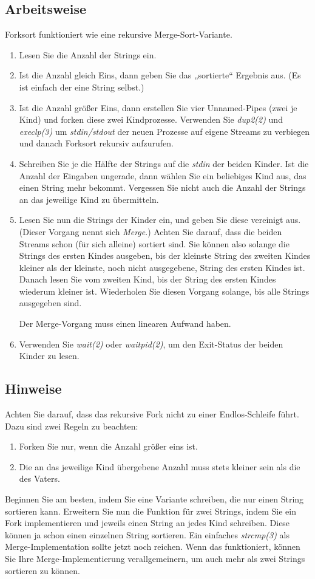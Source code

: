 \documentclass{article}
\begin{document}
\subsection{Arbeitsweise}
Forksort funktioniert wie eine rekursive Merge-Sort-Variante.
\begin{enumerate}
\item Lesen Sie die Anzahl der Strings ein.
\item Ist die Anzahl gleich Eins, dann geben Sie das „sortierte“
  Ergebnis aus. (Es ist einfach der eine String selbst.)
\item Ist die Anzahl größer Eins, dann erstellen Sie vier Unnamed-Pipes (zwei
  je Kind) und forken diese zwei Kindprozesse. Verwenden Sie \emph{dup2(2)} und
  \emph{execlp(3)} um \emph{stdin/stdout} der neuen Prozesse auf eigene Streams
  zu verbiegen und danach Forksort rekursiv aufzurufen.
\item Schreiben Sie je die Hälfte der Strings auf die \emph{stdin} der
  beiden Kinder. Ist die Anzahl der Eingaben ungerade, dann wählen Sie
  ein beliebiges Kind aus, das einen String mehr bekommt. Vergessen Sie nicht
  auch die Anzahl der Strings an das jeweilige Kind zu übermitteln.
\item Lesen Sie nun die Strings der Kinder ein, und geben Sie diese vereinigt
  aus. (Dieser Vorgang nennt sich \emph{Merge}.) Achten Sie darauf, dass die
  beiden Streams schon (für sich alleine) sortiert sind. Sie können also
  solange die Strings des ersten Kindes ausgeben, bis der kleinste String des
  zweiten Kindes kleiner als der kleinste, noch nicht ausgegebene, String des
  ersten Kindes ist. Danach lesen Sie vom zweiten Kind, bis der String des
  ersten Kindes wiederum kleiner ist. Wiederholen Sie diesen Vorgang solange,
  bis alle Strings ausgegeben sind.

  Der Merge-Vorgang muss einen linearen Aufwand haben.
\item Verwenden Sie \emph{wait(2)} oder \emph{waitpid(2)}, um den Exit-Status
  der beiden Kinder zu lesen.
\end{enumerate}

\subsection{Hinweise}
Achten Sie darauf, dass das rekursive Fork nicht zu einer Endlos-Schleife führt.
Dazu sind zwei Regeln zu beachten:
\begin{enumerate}
\item Forken Sie nur, wenn die Anzahl größer eins ist.
\item Die an das jeweilige Kind übergebene Anzahl muss stets kleiner sein als
  die des Vaters.
\end{enumerate}
Beginnen Sie am besten, indem Sie eine Variante schreiben, die nur einen String
sortieren kann. Erweitern Sie nun die Funktion für zwei Strings, indem Sie ein
Fork implementieren und jeweils einen String an jedes Kind schreiben. Diese
können ja schon einen einzelnen String sortieren. Ein einfaches
\emph{strcmp(3)} als Merge-Implementation sollte jetzt noch reichen. Wenn das
funktioniert, können Sie Ihre Merge-Implementierung verallgemeinern, um auch
mehr als zwei Strings sortieren zu können.
\end{document}
